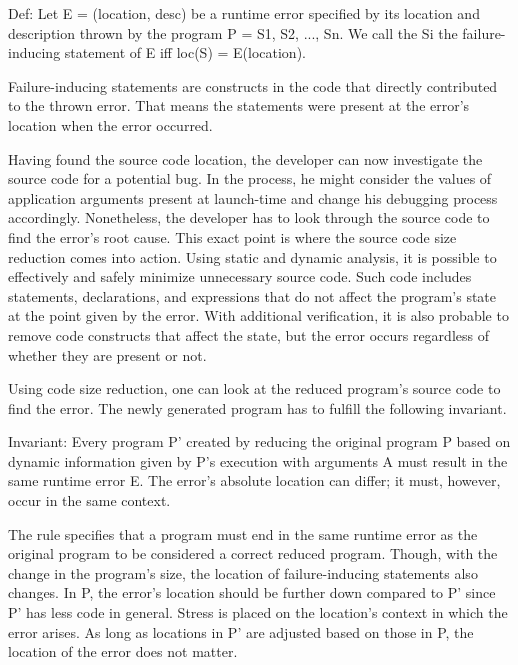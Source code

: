 Def: Let E = (location, desc) be a runtime error specified by its location 
and description thrown by the program P = {S1, S2, ..., Sn}.
We call the Si the failure-inducing statement of E iff loc(S) = E(location).

Failure-inducing statements are constructs in the code that directly 
contributed to the thrown error.
That means the statements were present at the error's location when the error 
occurred.

Having found the source code location, the developer can now investigate 
the source code for a potential bug.
In the process, he might consider the values of application arguments 
present at launch-time and change his debugging process accordingly.
Nonetheless, the developer has to look through the source code to find 
the error's root cause.
This exact point is where the source code size reduction comes into action.
Using static and dynamic analysis, it is possible to effectively and 
safely minimize unnecessary source code.
Such code includes statements, declarations, and expressions that do not 
affect the program's state at the point given by the error.
With additional verification, it is also probable to remove code constructs 
that affect the state, but the error occurs regardless of whether they 
are present or not.

Using code size reduction, one can look at the reduced program's source 
code to find the error.
The newly generated program has to fulfill the following invariant.

Invariant: Every program P' created by reducing the original program P 
based on dynamic information given by P's execution with arguments A 
must result in the same runtime error E.
The error's absolute location can differ; it must, however, occur in the 
same context.

The rule specifies that a program must end in the same runtime error 
as the original program to be considered a correct reduced program.
Though, with the change in the program's size, the location 
of failure-inducing statements also changes.
In P, the error's location should be further down compared to 
P' since P' has less code in general.
Stress is placed on the location's context in which the error arises.
As long as locations in P' are adjusted based on those in P, the 
location of the error does not matter.


